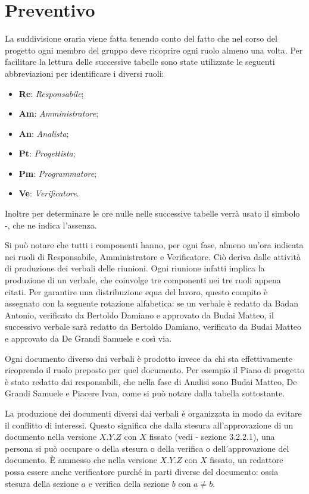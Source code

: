 \section{Preventivo}
La suddivisione oraria viene fatta tenendo conto del fatto che nel corso del progetto ogni  membro del gruppo deve ricoprire ogni ruolo almeno una volta.
Per facilitare la lettura delle successive tabelle sono state utilizzate le seguenti abbreviazioni per identificare i diversi ruoli:
\begin{itemize}
	\item \textbf{Re}: \textit{Responsabile};
	\item \textbf{Am}: \textit{Amministratore};
	\item \textbf{An}: \textit{Analista};
	\item \textbf{Pt}: \textit{Progettista};
	\item \textbf{Pm}: \textit{Programmatore};
	\item \textbf{Ve}: \textit{Verificatore}.
\end{itemize}
Inoltre per determinare le ore nulle nelle successive tabelle verrà usato il simbolo -, che ne indica l'assenza.

Si può notare che tutti i componenti hanno, per ogni fase, almeno un'ora indicata nei ruoli di Responsabile, Amministratore e Verificatore. Ciò deriva dalle attività di produzione dei verbali delle riunioni. Ogni riunione infatti implica la produzione di un verbale, che coinvolge tre componenti nei tre ruoli appena citati. Per garantire una distribuzione equa del lavoro, questo compito è assegnato con la seguente rotazione alfabetica: se un verbale è redatto da Badan Antonio, verificato da Bertoldo Damiano e approvato da Budai Matteo, il successivo verbale sarà redatto da Bertoldo Damiano, verificato da Budai Matteo e approvato da De Grandi Samuele e così via.

Ogni documento diverso dai verbali è prodotto invece da chi sta effettivamente ricoprendo il ruolo preposto per quel documento. Per esempio il Piano di progetto è stato redatto dai responsabili, che nella fase di Analisi sono Budai Matteo, De Grandi Samuele e Piacere Ivan, come si può notare dalla tabella sottostante. 

La produzione dei documenti diversi dai verbali è organizzata in modo da evitare il conflitto di interessi. Questo significa che dalla stesura all'approvazione di un documento nella versione $X.Y.Z$ con $X$ fissato (vedi  - sezione 3.2.2.1), una persona si può occupare o della stesura o della verifica o dell'approvazione del documento. È ammesso che nella versione $X.Y.Z$ con $X$ fissato, un redattore possa essere anche verificatore purché in parti diverse del documento: ossia stesura della sezione $a$ e verifica della sezione $b$ con $a \neq b$. 

